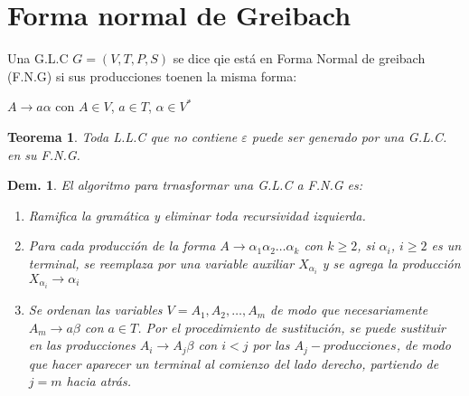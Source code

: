 \documentclass[12pt]{article}
\newtheorem{teorema}{Teorema}
\newtheorem{demostracion}{Dem. }
\begin{document}
\section{Forma normal de Greibach}

Una G.L.C $G = (V, T, P, S)$ se dice qie está en Forma Normal de greibach (F.N.G) si sus producciones toenen la misma forma:

\begin{center}
    $A \rightarrow a\alpha$ con $A \in V$, $a \in T$, $\alpha \in V^*$
\end{center}

\begin{teorema}
  Toda L.L.C que no contiene $\varepsilon$ puede ser generado por una G.L.C. en su F.N.G.
\end{teorema}

\begin{demostracion}
  El algoritmo para trnasformar una G.L.C a F.N.G es:

  \begin{enumerate}
    \item Ramifica la gramática y eliminar toda recursividad izquierda.
    \item Para cada producción de la forma $A \rightarrow \alpha_1\alpha_2\dots\alpha_k$ con $k\geq2$, si $\alpha_i$, $i\geq2$ es un terminal, se reemplaza por una variable auxiliar $X_{\alpha_i}$ y se agrega la producción $X_{\alpha_i}\rightarrow\alpha_i$
    \item Se ordenan las variables $V = {A_1, A_2, \dots, A_m}$ de modo que necesariamente $A_m \rightarrow a\beta$ con $a \in T$. Por el procedimiento de sustitución, se puede sustituir en las producciones $A_i \rightarrow A_j\beta$ con $i<j$ por las $A_j - producciones$, de modo que hacer aparecer un terminal al comienzo del lado derecho, partiendo de $j = m$ hacia atrás.
  \end{enumerate}
\end{demostracion}
\end{document}
